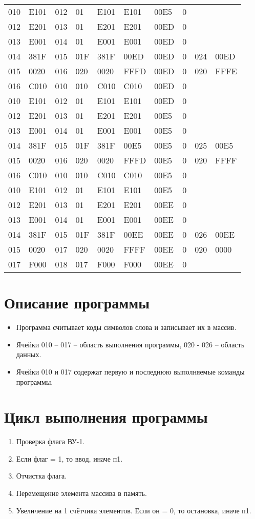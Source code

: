 \documentclass[a4paper,14pt]{article}
\begin{document}
\begin{tabular}{llllllllll}
    010 & E101 & 012 & 01 & E101 & E101 & 00E5 & 0\\
    012 & E201 & 013 & 01 & E201 & E201 & 00ED & 0\\
    013 & E001 & 014 & 01 & E001 & E001 & 00ED & 0\\
    014 & 381F & 015 & 01F & 381F & 00ED & 00ED & 0 & 024 & 00ED\\
    015 & 0020 & 016 & 020 & 0020 & FFFD & 00ED & 0 & 020 & FFFE\\
    016 & C010 & 010 & 010 & C010 & C010 & 00ED & 0\\
    010 & E101 & 012 & 01 & E101 & E101 & 00ED & 0\\
    012 & E201 & 013 & 01 & E201 & E201 & 00E5 & 0\\
    013 & E001 & 014 & 01 & E001 & E001 & 00E5 & 0\\
    014 & 381F & 015 & 01F & 381F & 00E5 & 00E5 & 0 & 025 & 00E5\\
    015 & 0020 & 016 & 020 & 0020 & FFFD & 00E5 & 0 & 020 & FFFF\\
    016 & C010 & 010 & 010 & C010 & C010 & 00E5 & 0\\
    010 & E101 & 012 & 01 & E101 & E101 & 00E5 & 0\\
    012 & E201 & 013 & 01 & E201 & E201 & 00EE & 0\\
    013 & E001 & 014 & 01 & E001 & E001 & 00EE & 0\\
    014 & 381F & 015 & 01F & 381F & 00EE & 00EE & 0 & 026 & 00EE\\
    015 & 0020 & 017 & 020 & 0020 & FFFF & 00EE & 0 & 020 & 0000\\
    017 & F000 & 018 & 017 & F000 & F000 & 00EE & 0\\
    \hline
\end{tabular}

\section{Описание программы}
\begin{itemize}
    \item Программа считывает коды символов слова и записывает их в массив.
    \item Ячейки 010 – 017 – область выполнения программы, 020 - 026 – область данных.
    \item Ячейки 010 и 017 содержат первую и последнюю выполняемые команды программы.
\end{itemize}

\section{Цикл выполнения программы}
\begin{enumerate}
    \item Проверка флага ВУ-1.
    \item Если флаг = 1, то ввод, иначе п1.
    \item Отчистка флага.
    \item Перемещение элемента массива в память.
    \item Увеличение на 1 счётчика элементов. Если он = 0, то остановка, иначе п1.
\end{enumerate}
\end{document}
